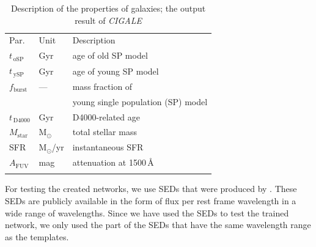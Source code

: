        
    \begin{table}
\caption[]{Description of the properties of  galaxies; the output result of {\em CIGALE}}     
\label{tab: props}
\centering
\begin{tabular}{l l l}
\hline\hline
\noalign{\smallskip}
Par. & Unit & Description\\
\noalign{\smallskip}
\hline
\noalign{\smallskip}
$t_{\,\mathrm{oSP}}$ & Gyr & age of old SP model \\
$t_{\,\mathrm{ySP}}$ & Gyr & age of young SP model \\
$f_\mathrm{burst}$ & --- & mass fraction of \\
& & young single population (SP) model \\
\noalign{\smallskip}
$t_{\,\mathrm{D4000}}$ & Gyr & D4000-related age \\
\noalign{\smallskip}
$M_\mathrm{star}$ & M$_\odot$ & total stellar mass  \\
SFR & M$_\odot$/yr & instantaneous SFR  \\
$A_\mathrm{FUV}$ & mag & attenuation at 1500\,\AA{} \\
\noalign{\smallskip}
\hline
\end{tabular}
\end{table}

    For testing the created networks, we use SEDs that were produced by . 
    These SEDs are publicly available in the form of flux per rest frame wavelength in a wide range of wavelengths. %
    Since we have used the  SEDs to test the trained network, we only used the part of the SEDs that have the same wavelength range as the  templates.  


